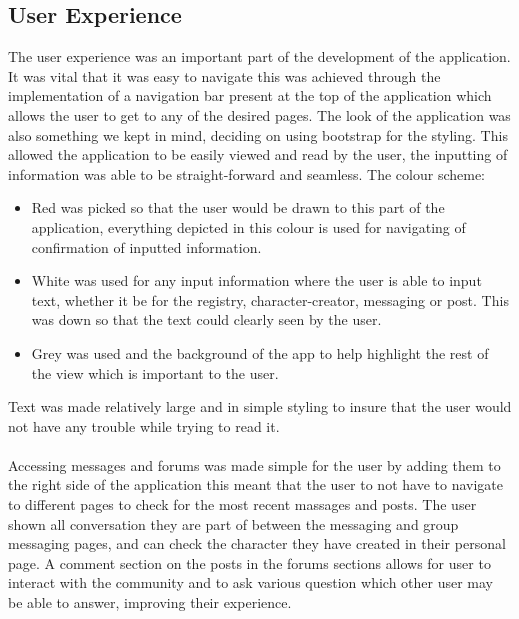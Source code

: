 \subsection{User Experience}
The user experience was an important part of the development of the application.  It was vital that it was easy to navigate this was achieved through the implementation of a navigation bar present at the top of the application which allows the user to get to any of the desired pages.  The look of the application was also something we kept in mind, deciding on using bootstrap for the styling.  This allowed the application to be easily viewed and read by the user, the inputting of information was able to be straight-forward and seamless.  The colour scheme: 
\begin{itemize}
    \item Red was picked so that the user would be drawn to this part of the application, everything depicted in this colour is used for navigating of confirmation of inputted information.
    \item White was used for any input information where the user is able to input text, whether it be for the registry, character-creator, messaging or post.  This was down so that the text could clearly seen by the user.
    \item Grey was used and the background of the app to help highlight the rest of the view which is important to the user.
\end{itemize}
Text was made relatively large and in simple styling to insure that the user would not have any trouble while trying to read it.\\\\
Accessing messages and forums was made simple for the user by adding them to the right side of the application this meant that the user to not have to navigate to different pages to check for the most recent massages and posts.  The user shown all conversation they are part of between the messaging and group messaging pages, and can check the character they have created in their personal page.  A comment section on the posts in the forums sections allows for user to interact with the community and to ask various question which other user may be able to answer, improving their experience.

